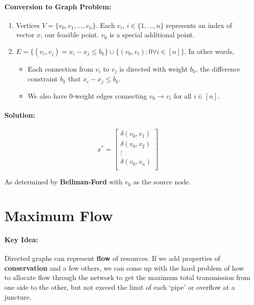 \documentclass[a4paper,12pt]{report}
\begin{document}
\paragraph{Conversion to Graph Problem: } 
\begin{enumerate}
\item Vertices $V = \{v_0, v_1, ..., v_n\}$. Each $v_i, \, i\in \{1,..., n\}$ represents an index of vector $x$, our feasible point. $v_0$ is a special additional point. 
\item $E = \{(v_i, v_j) = x_i-x_j \leq b_k\}\cup \{(v_0, v_i):0 \forall i\in [n]\}$. In other words,
\begin{itemize}
\item Each connection from $v_i$ to $v_j$ is directed with weight $b_k$, the difference constraint $b_k$ that $x_i-x_j \leq b_k$.
\item We also have 0-weight edges connecting $v_0 \to v_i$ for all $i\in [n]$.
\end{itemize}
\end{enumerate}

\paragraph{Solution: } 
\begin{equation}
x^* = \begin{bmatrix}
\delta(v_0, v_1) \\
\delta(v_0, v_2) \\ 
\vdots \\
\delta(v_0, v_n) \\
\end{bmatrix}
\end{equation}

As determined by \textbf{Bellman-Ford} with $v_0$ as the source node. 




\section{Maximum Flow}

\paragraph{Key Idea: } Directed graphs can represent \textbf{flow} of resources. If we add properties of \textbf{conservation} and a few others, we can come up with the hard problem of how to allocate flow through the network to get the maximum total transmission from one side to the other, but not exceed the limit of each `pipe' or overflow at a juncture. 
\end{document}
